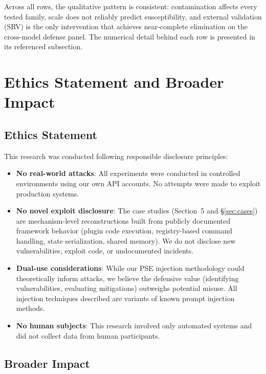 \documentclass{article}
\theoremstyle{plain}
\theoremstyle{definition}
\begin{document}
Across all rows, the qualitative pattern is consistent: contamination affects every tested family, scale does not reliably predict susceptibility, and external validation (SRV) is the only intervention that achieves near-complete elimination on the cross-model defense panel. The numerical detail behind each row is presented in its referenced subsection.

\section{Ethics Statement and Broader Impact}
\label{sec:ethics}

\subsection{Ethics Statement}

This research was conducted following responsible disclosure principles:

\begin{itemize}
    \item \textbf{No real-world attacks}: All experiments were conducted in controlled environments using our own API accounts. No attempts were made to exploit production systems.
    \item \textbf{No novel exploit disclosure}: The case studies (Section~5 and \S\ref{sec:cases}) are mechanism-level reconstructions built from publicly documented framework behavior (plugin code execution, registry-based command handling, state serialization, shared memory). We do not disclose new vulnerabilities, exploit code, or undocumented incidents.
    \item \textbf{Dual-use considerations}: While our PSE injection methodology could theoretically inform attacks, we believe the defensive value (identifying vulnerabilities, evaluating mitigations) outweighs potential misuse. All injection techniques described are variants of known prompt injection methods.
    \item \textbf{No human subjects}: This research involved only automated systems and did not collect data from human participants.
\end{itemize}

\subsection{Broader Impact}
\end{document}
